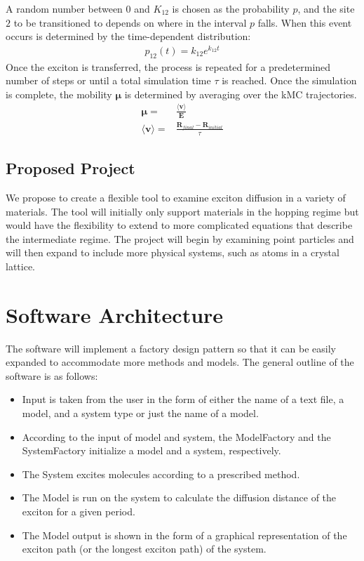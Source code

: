 \documentclass{article}
\begin{document}
A random number between $0$ and $K_{12}$ is chosen as the probability $p$, and the site $2$ to be transitioned to depends on where in the interval $p$ falls. When this event occurs is determined by the time-dependent distribution:
\begin{align}
    p_{12}(t)=k_{12}e^{k_{12}t}
\end{align}
Once the exciton is transferred, the process is repeated for a predetermined number of steps or until a total simulation time $\tau$ is reached. 
Once the simulation is complete, the mobility $\mathbf{\mu}$ is determined by averaging over the kMC trajectories.
\begin{align}
    \mathbf{\mu}=&\frac{\langle \mathbf{v}\rangle}{\mathbf{E}}\\
    \langle\mathbf{v}\rangle=&\frac{\mathbf{R}_{final}-\mathbf{R}_{initial}}{\tau}
\end{align}


\subsection{Proposed Project}

We propose to create a flexible tool to examine exciton diffusion in a variety of materials. The tool will initially only support materials in the hopping regime but would have the flexibility to extend to more complicated equations that describe the intermediate regime. The project will begin by examining point particles and will then expand to include more physical systems, such as atoms in a crystal lattice.

\section{Software Architecture}

The software will implement a factory design pattern so that it can be easily expanded to accommodate more methods and models. The general outline of the software is as follows:

\begin{itemize}
    \item Input is taken from the user in the form of either the name of a text file, a model, and a system type or just the name of a model.
    \item According to the input of model and system, the ModelFactory and the SystemFactory initialize a model and a system, respectively.
    \item The System excites molecules according to a prescribed method.
    \item The Model is run on the system to calculate the diffusion distance of the exciton for a given period.
    \item The Model output is shown in the form of a graphical representation of the exciton path (or the longest exciton path) of the system.
\end{itemize}
\end{document}
